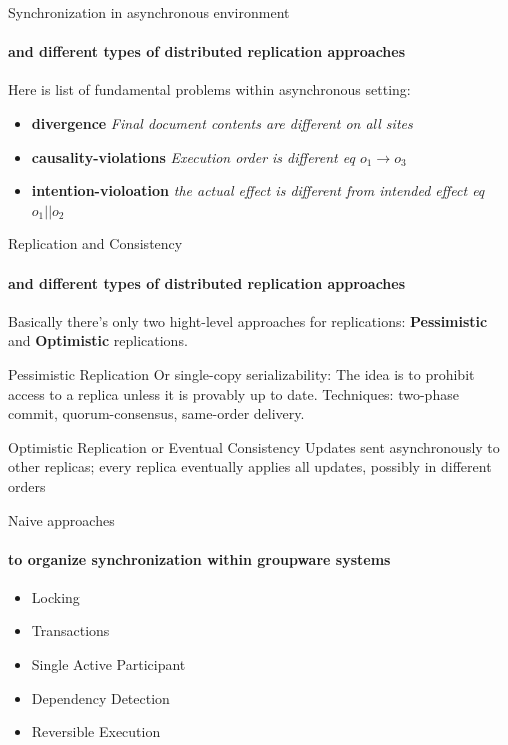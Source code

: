 \documentclass{beamer}
\begin{document}
\begin{frame}{Synchronization in asynchronous environment}
\framesubtitle{and different types of distributed replication approaches}

Here is list of fundamental problems within asynchronous setting:
\begin{itemize}

\item \textbf{divergence} \small{\textit{Final document contents are different on all sites}}
\item \textbf{causality-violations} \small{\textit{Execution order is different eq $o_1 \rightarrow o_3$}}
\item \textbf{intention-violoation} \small{\textit{the actual effect is different from intended effect eq $o_1 || o_2$}}
\end{itemize}
\end{frame}

\begin{frame}{Replication and Consistency}
\framesubtitle{and different types of distributed replication approaches}
Basically there's only two hight-level approaches for replications: \textbf{Pessimistic} and \textbf{Optimistic} replications.
\vspace{0.5cm}
\begin{block}{Pessimistic Replication}
Or single-copy serializability: The idea is to prohibit access to a replica unless it is provably up to date. Techniques: two-phase commit, quorum-consensus, same-order delivery.
\end{block}
\vspace{0.5cm}
\begin{block}{Optimistic Replication or Eventual Consistency}
Updates sent asynchronously to other replicas;
every replica eventually applies all updates, possibly in different orders
\end{block}

\end{frame}


\begin{frame}{Naive approaches}
\framesubtitle{to organize synchronization within groupware systems}

\begin{itemize}
  \item Locking
  \item Transactions
  \item Single Active Participant
  \item Dependency Detection
  \item Reversible Execution
\end{itemize}

\end{frame}
\end{document}
